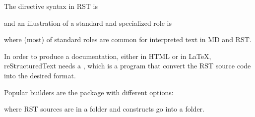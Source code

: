 \documentclass[a4paper,12pt,english]{sphinxhowto}
\begin{document}
The directive syntax in RST is
\begin{quote}

\begin{sphinxVerbatim}[commandchars=\\\{\},formatcom=\footnotesize]
   
\end{sphinxVerbatim}
\end{quote}

and an illustration of a standard and specialized role is
\begin{quote}

\begin{sphinxVerbatim}[commandchars=\\\{\},formatcom=\footnotesize]
   
   
\end{sphinxVerbatim}
\end{quote}

where (most) of standard roles are common for interpreted text in MD and RST.

In order to produce a documentation, either in HTML or in LaTeX, reStructuredText needs a , which is
a program that convert the RST source code into the desired format.

Popular builders are  the  package  with different options:
\begin{quote}

\begin{sphinxVerbatim}[commandchars=\\\{\},formatcom=\footnotesize]
    
    
\end{sphinxVerbatim}
\end{quote}

where RST sources are in a  folder and constructs go into a  folder.
\end{document}
